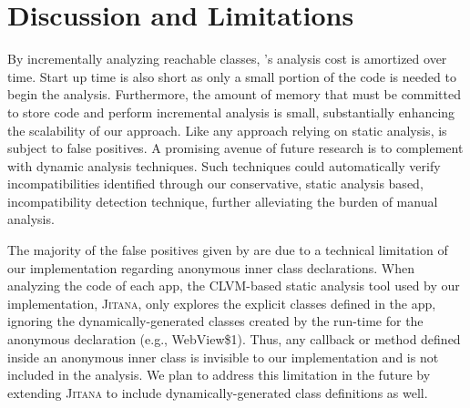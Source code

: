 \section{Discussion and Limitations}\label{sec-discussion}


By incrementally analyzing reachable classes, \@approach's
analysis cost is amortized over time.  
Start up time is also short as only a small
portion of the code is needed to begin the analysis.
Furthermore, the amount of memory that must be committed to store code
and perform incremental analysis is small,
substantially enhancing the
scalability of our approach. 
Like any approach relying on static analysis, \@approach is subject
to false positives. A promising avenue of future research is
to complement \@approach with dynamic analysis techniques.
Such techniques could automatically verify
incompatibilities identified through our conservative,
static analysis based, incompatibility detection technique,
further alleviating the burden of manual analysis.

The majority of the false positives given by \@approach are due to a technical limitation of our implementation regarding anonymous inner class declarations.  
When analyzing the code of each app, the CLVM-based static analysis tool used by our implementation, \textsc{Jitana}, only explores the explicit classes defined in the app, ignoring the dynamically-generated classes created by the run-time for the anonymous declaration (e.g., WebView\$1). 
Thus, any callback or method defined inside an anonymous inner class is invisible to our implementation and is not included in the analysis. 
We plan to address this limitation in the future by extending \textsc{Jitana} to include dynamically-generated class definitions as well.

